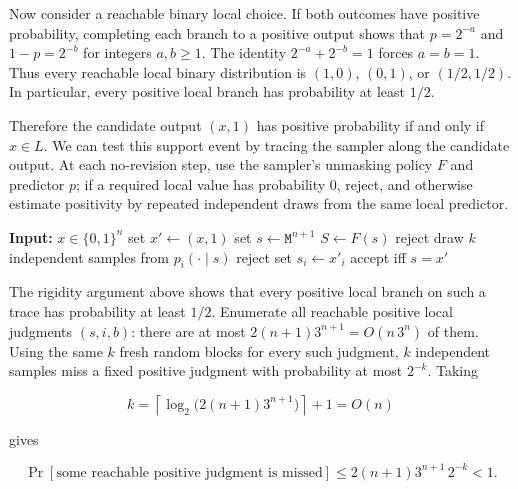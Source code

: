 \documentclass[10pt]{article}
\theoremstyle{definition}
\newcommand{\bits}{\{0,1\}}
\newcommand{\mask}{\mathtt{M}}
\begin{document}
Now consider a reachable binary local choice.  If both outcomes have positive
probability, completing each branch to a positive output shows that
$p=2^{-a}$ and $1-p=2^{-b}$ for integers $a,b\ge1$.  The identity
$2^{-a}+2^{-b}=1$ forces $a=b=1$.  Thus every reachable local binary
distribution is $(1,0)$, $(0,1)$, or $(1/2,1/2)$.  In particular, every
positive local branch has probability at least $1/2$.

Therefore the candidate output $(x,1)$ has positive probability if and only
if $x\in L$.  We can test this support event by tracing the sampler along the
candidate output.  At each no-revision step, use the sampler's unmasking
policy $F$ and predictor $p$; if a required local value has probability $0$,
reject, and otherwise estimate positivity by repeated independent draws from
the same local predictor.

\begin{algorithm}[ht]
\caption{SupportTest: deciding whether the candidate pair $(x,1)$ lies in the
sampler's support}
\label{alg:supporttest}
\begin{algorithmic}[1]
\State \textbf{Input:} $x\in\bits^n$
\State set $x'\gets(x,1)$
\State set $s\gets\mask^{n+1}$
  \State $S\gets F(s)$
  \If{$S\nsubseteq\{i:s_i=\mask\}$} \State \Return reject \EndIf
    \State draw $k$ independent samples from $p_i(\cdot\mid s)$
      \State \Return reject
    \EndIf
    \State set $s_i\gets x'_i$
  \EndFor
\EndFor
\State \Return accept iff $s=x'$
\end{algorithmic}
\end{algorithm}

The rigidity argument above shows that every positive local branch on such a
trace has probability at least $1/2$.  Enumerate all reachable positive local
judgments $(s,i,b)$: there are at most
$2(n+1)3^{n+1}=O(n\,3^n)$ of them.  Using the same $k$ fresh random blocks
for every such judgment, $k$ independent samples miss a fixed positive
judgment with probability at most $2^{-k}$.  Taking

\begin{equation}
 k=\left\lceil\log_2\bigl(2(n+1)3^{n+1}\bigr)\right\rceil+1=O(n)
\end{equation}

gives

\begin{equation}
 \Pr[\text{some reachable positive judgment is missed}]
  \le 2(n+1)3^{n+1}\,2^{-k}<1.
\end{equation}
\end{document}
